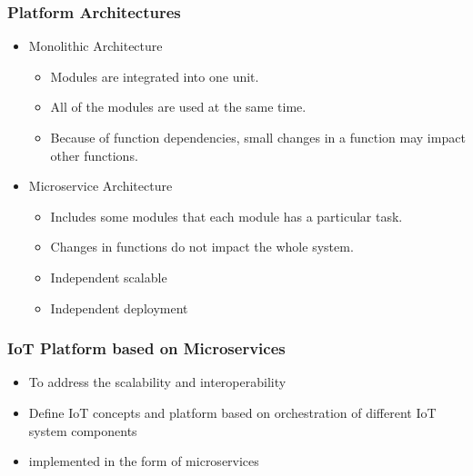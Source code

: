 \documentclass{../iot-lecture}
\begin{document}
\begin{frame}
  \frametitle{Platform Architectures}
  \begin{itemize}
    \item Monolithic Architecture
    \begin{itemize}
      \item Modules are integrated into one unit.
      \item All of the modules are used at the same time.
      \item Because of function dependencies, small changes in a function
        may impact other functions.
    \end{itemize}
    \item Microservice Architecture
    \begin{itemize}
      \item Includes some modules that each module has a particular task.
      \item Changes in functions do not impact the whole system.
      \item Independent scalable
      \item Independent deployment
    \end{itemize}
  \end{itemize}
\end{frame}

\begin{frame}
  \frametitle{IoT Platform based on Microservices}
  \begin{itemize}
    \item To address the scalability and interoperability
    \item Define IoT concepts and platform based on orchestration of different IoT system components
    \item implemented in the form of microservices
  \end{itemize}
\end{frame}
\end{document}

